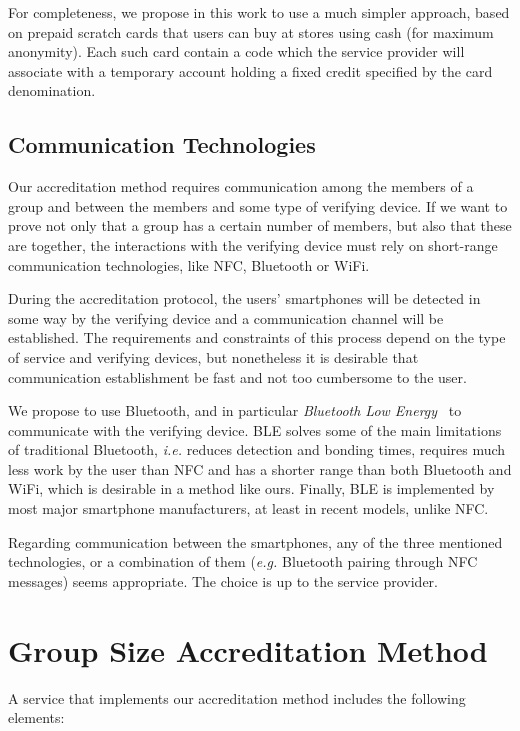 \documentclass[11pt]{llncs}
\begin{document}
For completeness, we propose in this work to use a much 
simpler approach, based on prepaid scratch cards that users 
can buy at stores using cash (for maximum anonymity). 
Each such card contain a code 
which the service provider will associate with
a temporary account holding a fixed credit specified
by the card denomination. 


\subsection{Communication Technologies}\label{ab.subsec.comm}

Our accreditation method requires communication among
the members of a group and between the members and
some type of verifying device.
If we want to prove not only that a group has a
certain number of members, but also that these are
together, the interactions
with the verifying device must rely on
short-range communication technologies, like
NFC, Bluetooth or WiFi.

During the accreditation protocol, the users' smartphones
will be detected in some way by the verifying device and a
communication channel will be established. The requirements and
constraints of this process depend on the type of service
and verifying devices, but nonetheless it is desirable that
communication establishment be fast and not too cumbersome to the user.

We propose to use Bluetooth, and in particular
\emph{Bluetooth Low Energy}~\cite{ab.Bluetooth2013}
to communicate with the verifying device.
BLE solves some of the main limitations of traditional Bluetooth, \emph{i.e.}
reduces detection and  bonding times, requires much less work
by the user than NFC and has a shorter range than
both Bluetooth and WiFi, which is desirable in a method
like ours. Finally, BLE is implemented by most major
smartphone manufacturers, at least in recent models,
unlike NFC.

Regarding communication between the smartphones,
any of the three mentioned technologies, or a combination
of them (\emph{e.g.} Bluetooth pairing through NFC messages)
seems appropriate. The choice is up to
the service provider.


\section{Group Size Accreditation Method}\label{ab.sec.system}

A service that implements our accreditation method
includes the following elements:
\end{document}
